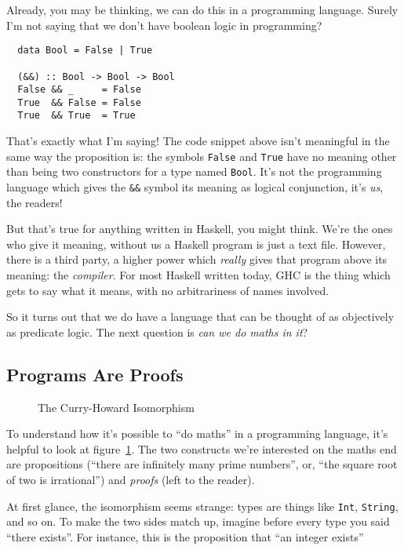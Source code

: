 \documentclass[twocolumn]{article}
\theoremstyle{definition}
\theoremstyle{definition}
\begin{document}
Already, you may be thinking, we can do this in a programming language. Surely
I'm not saying that we don't have boolean logic in programming?

\begin{verbatim}
  data Bool = False | True

  (&&) :: Bool -> Bool -> Bool
  False && _     = False
  True  && False = False
  True  && True  = True
\end{verbatim}

That's exactly what I'm saying! The code snippet above isn't meaningful in the
same way the proposition is: the symbols \verb+False+ and \verb+True+ have no
meaning other than being two constructors for a type named \verb+Bool+. It's not
the programming language which gives the \verb+&&+ symbol its meaning as logical
conjunction, it's \emph{us}, the readers!

But that's true for anything written in Haskell, you might think. We're the ones
who give it meaning, without us a Haskell program is just a text file. However,
there is a third party, a higher power which \emph{really} gives that program
above its meaning: the \emph{compiler}. For most Haskell written today, GHC is
the thing which gets to say what it means, with no arbitrariness of names
involved.

So it turns out that we do have a language that can be thought of as objectively
as predicate logic. The next question is \emph{can we do maths in it}?
\subsection{Programs Are Proofs}
\begin{figure}
  \centering
  \caption{The Curry-Howard Isomorphism}
  \label{CH}
\end{figure}
To understand how it's possible to ``do maths'' in a programming language, it's
helpful to look at figure~\ref{CH}. The two constructs we're interested on the
maths end are propositions (``there are infinitely many prime numbers'', or,
``the square root of two is irrational'') and \emph{proofs} (left to the
reader).

At first glance, the isomorphism seems strange: types are things like
\verb+Int+, \verb+String+, and so on. To make the two sides match up, imagine
before every type you said ``there exists''. For instance, this is the
proposition that ``an integer exists''
\end{document}
